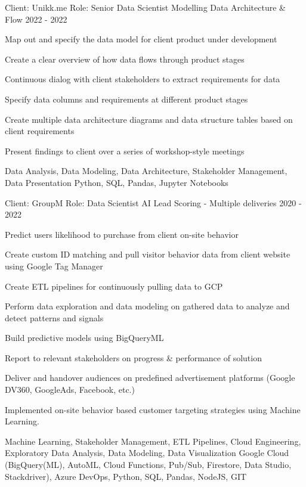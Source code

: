 \begin{cventries}
\cventry
{Client: Unikk.me \newline Role: Senior Data Scientist} %
{Modelling Data Architecture \& Flow} %
{}%
{2022 - 2022} %
{ %
\begin{cvitems}
\item {Map out and specify the data model for client product under development}
\item {Create a clear overview of how data flows through product stages}
\item {Continuous dialog with client stakeholders to extract requirements for data}
\item {Specify data columns and requirements at different product stages}
\item {Create multiple data architecture diagrams and data structure tables based on client requirements}
\item {Present findings to client over a series of workshop-style meetings}
\end{cvitems}
\cventrykeywords
{Data Analysis, Data Modeling, Data Architecture, Stakeholder Management, Data Presentation}
{Python, SQL, Pandas, Jupyter Notebooks}
}

\cventry
{Client: GroupM \newline Role: Data Scientist} %
{AI Lead Scoring - Multiple deliveries} %
{}%
{2020 - 2022} %
{ %
\begin{cvitems}
\item {Predict users likelihood to purchase from client on-site behavior}
\item {Create custom ID matching and pull visitor behavior data from client website using Google Tag Manager }
\item {Create ETL pipelines for continuously pulling data to GCP}
\item {Perform data exploration and data modeling on gathered data to analyze and detect patterns and signals}
\item {Build predictive models using BigQueryML}
\item {Report to relevant stakeholders on progress \& performance of solution}
\item {Deliver and handover audiences on predefined advertisement platforms (Google DV360, GoogleAds, Facebook, etc.) }
\item {Implemented on-site behavior based customer targeting strategies using Machine Learning.}
\end{cvitems}
\cventrykeywords
{Machine Learning, Stakeholder Management, ETL Pipelines, Cloud Engineering,  Exploratory Data Analysis, Data Modeling, Data Visualization}
{Google Cloud (BigQuery(ML), AutoML, Cloud Functions, Pub/Sub, Firestore, Data Studio, Stackdriver), Azure DevOps, Python, SQL, Pandas, NodeJS, GIT}
}


\end{cventries}
